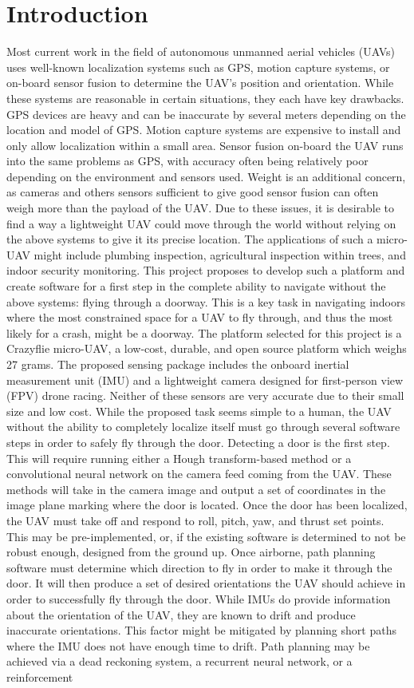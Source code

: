 \documentclass[12pt]{article}
\begin{document}
\section{Introduction}
Most current work in the field of autonomous unmanned aerial vehicles (UAVs) uses well-known localization systems such as GPS, motion capture systems, or on-board sensor fusion to determine the UAV's position and orientation. While these systems are reasonable in certain situations, they each have key drawbacks. GPS devices are heavy and can be inaccurate by several meters depending on the location and model of GPS. Motion capture systems are expensive to install and only allow localization within a small area. Sensor fusion on-board the UAV runs into the same problems as GPS, with accuracy often being relatively poor depending on the environment and sensors used. Weight is an additional concern, as cameras and others sensors sufficient to give good sensor fusion can often weigh more than the payload of the UAV. Due to these issues, it is desirable to find a way a lightweight UAV could move through the world without relying on the above systems to give it its precise location. The applications of such a micro-UAV might include plumbing inspection, agricultural inspection within trees, and indoor security monitoring. This project proposes to develop such a platform and create software for a first step in the complete ability to navigate without the above systems: flying through a doorway. This is a key task in navigating indoors where the most constrained space for a UAV to fly through, and thus the most likely for a crash, might be a doorway. The platform selected for this project is a Crazyflie micro-UAV, a low-cost, durable, and open source platform which weighs 27 grams. The proposed sensing package includes the onboard inertial measurement unit (IMU) and a lightweight camera designed for first-person view (FPV) drone racing. Neither of these sensors are very accurate due to their small size and low cost. While the proposed task seems simple to a human, the UAV without the ability to completely localize itself must go through several software steps in order to safely fly through the door. Detecting a door is the first step. This will require running either a Hough transform-based method or a convolutional neural network on the camera feed coming from the UAV. These methods will take in the camera image and output a set of coordinates in the image plane marking where the door is located. Once the door has been localized, the UAV must take off and respond to roll, pitch, yaw, and thrust set points. This may be pre-implemented, or, if the existing software is determined to not be robust enough, designed from the ground up. Once airborne, path planning software must determine which direction to fly in order to make it through the door. It will then produce a set of desired orientations the UAV should achieve in order to successfully fly through the door. While IMUs do provide information about the orientation of the UAV, they are known to drift and produce inaccurate orientations. This factor might be mitigated by planning short paths where the IMU does not have enough time to drift. Path planning may be achieved via a dead reckoning system, a recurrent neural network, or a reinforcement 
\end{document}
